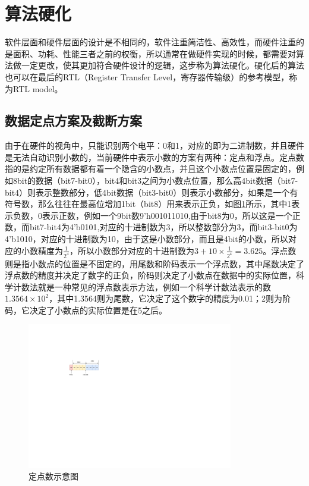 \section{算法硬化}
软件层面和硬件层面的设计是不相同的，软件注重简洁性、高效性，而硬件注重的是面积、功耗、性能三者之前的权衡，所以通常在做硬件实现的时候，都需要对算法做一定更改，使其更加符合硬件设计的逻辑，这步称为算法硬化。硬化后的算法也可以在最后的RTL（Register Transfer Level，寄存器传输级）的参考模型，称为RTL model。

\subsection{数据定点方案及截断方案}
由于在硬件的视角中，只能识别两个电平：0和1，对应的即为二进制数，并且硬件是无法自动识别小数的，当前硬件中表示小数的方案有两种：定点和浮点。定点数指的是约定所有数据都有着一个隐含的小数点，并且这个小数点位置是固定的，例如8bit的数据（bit7-bit0），bit4和bit3之间为小数点位置，那么高4bit数据（bit7-bit4）则表示整数部分，低4bit数据（bit3-bit0）则表示小数部分，如果是一个有符号数，那么往往在最高位增加1bit（bit8）用来表示正负，如图\ref{fig:定点数示意图}所示，其中1表示负数，0表示正数，例如一个9bit数9'h001011010,由于bit8为0，所以这是一个正数，而bit7-bit4为4'b0101,对应的十进制数为3，所以整数部分为3，而bit3-bit0为4'b1010，对应的十进制数为10，由于这是小数部分，而且是4bit的小数，所以对应的小数精度为$\frac{1}{2^4}$，所以小数部分对应的十进制数为$3+10\times\frac{1}{2^4}=3.625$。浮点数则是指小数点的位置是不固定的，用尾数和阶码表示一个浮点数，其中尾数决定了浮点数的精度并决定了数字的正负，阶码则决定了小数点在数据中的实际位置，科学计数法就是一种常见的浮点数表示方法，例如一个科学计数法表示的数$1.3564\times10^{2}$，其中1.3564则为尾数，它决定了这个数字的精度为0.01；2则为阶码，它决定了小数点的实际位置是在5之后。
\begin{figure}[htb]
  \centering
  \includegraphics[width=9cm]{fig/4-fig/定点数示意图.drawio.pdf}
  \caption{定点数示意图}
  \label{fig:定点数示意图}
\end{figure}


